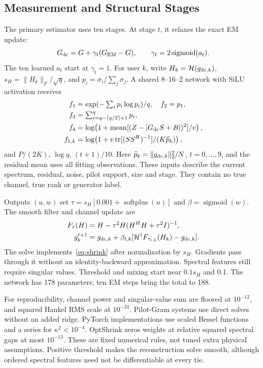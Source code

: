 \documentclass[10pt,journal,letterpaper]{IEEEtran}
\newcommand{\HH}{\mathcal{H}}
\DeclareMathOperator{\tr}{tr}
\DeclareMathOperator{\sigmoid}{sigmoid}
\DeclareMathOperator{\softplus}{softplus}
\begin{document}
\subsection{Measurement and Structural Stages}
The primary estimator uses ten stages. At stage $t$, it relaxes the exact EM update:
\begin{equation}
 G_{\rm dc}=G+\gamma_t(G_{\rm EM}-G),\qquad
 \gamma_t=2\sigmoid(a_t).
\end{equation}
The ten learned $a_t$ start at $\gamma_t=1$. For user $k$, write $H_k=\HH(g_{{\rm dc},k})$, $s_H=\|H_k\|_F/\sqrt q$, and $p_i=\sigma_i/\sum_j\sigma_j$. A shared 8--16--2 network with SiLU activation receives
\begin{align}
 f_1&=\exp(-\textstyle\sum_i p_i\log p_i)/q,\quad f_2=p_1,\nonumber\\
 f_3&=\textstyle\sum_{i=q-\lceil q/2\rceil+1}^q p_i,\nonumber\\
 f_4&=\log\!\left(1+\operatorname{mean}[(Z-|G_{\rm dc}S+B|)^2]/v\right),\nonumber\\
 f_{5,k}&=\log\!\left(1+v\tr[(SS^H)^{-1}]/(K\widehat p_k)\right),
 \label{eq:features}
\end{align}
and $P/(2K)$, $\log q$, $(t+1)/10$. Here $\widehat p_k=\|g_{{\rm dc},k}\|_2^2/N$, $t=0,\ldots,9$, and the residual mean uses all fitting observations. These inputs describe the current spectrum, residual, noise, pilot support, size and stage. They contain no true channel, true rank or generator label.

Outputs $(u,w)$ set $\tau=s_H[0.001+\softplus(u)]$ and $\beta=\sigmoid(w)$. The smooth filter and channel update are
\begin{align}
 F_\tau(H)&=H-\tau^2H(H^HH+\tau^2I)^{-1},\label{eq:solve}\\
 g_k^{t+1}&=g_{{\rm dc},k}+\beta_{t,k}
 [\HH^\dagger F_{\tau_{t,k}}(H_k)-g_{{\rm dc},k}].
\end{align}
The solve implements~\eqref{eq:shrink} after normalization by $s_H$. Gradients pass through it without an identity-backward approximation. Spectral features still require singular values. Threshold and mixing start near $0.1s_H$ and 0.1. The network has 178 parameters; ten EM steps bring the total to 188.

For reproducibility, channel power and singular-value sum are floored at $10^{-12}$, and squared Hankel RMS scale at $10^{-24}$. Pilot-Gram systems use direct solves without an added ridge. PyTorch implementations use scaled Bessel functions and a series for $\kappa^2<10^{-4}$. OptShrink zeros weights at relative squared spectral gaps at most $10^{-13}$. These are fixed numerical rules, not tuned extra physical assumptions. Positive threshold makes the reconstruction solve smooth, although ordered spectral features need not be differentiable at every tie.
\end{document}
